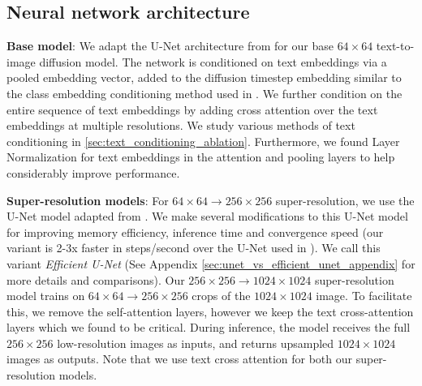 \subsection{Neural network architecture}
\vspace{-0.15cm}
\label{sec:architecture}
\textbf{Base model}: We adapt the U-Net architecture from \cite{nichol2021improved} for our base $64\times64$ text-to-image diffusion model. The network is conditioned on text embeddings via a pooled embedding vector, added to the diffusion timestep embedding similar to the class embedding conditioning method used in \cite{dhariwal2021diffusion, ho2021cascaded}. We further condition on the entire sequence of text embeddings by adding cross attention \cite{rombach-cvpr-2022} over the text embeddings at multiple resolutions. We study various methods of text conditioning in \cref{sec:text_conditioning_ablation}. Furthermore, we found Layer Normalization \cite{ba2016layer} for text embeddings in the attention and pooling layers to help considerably improve performance. 



\textbf{Super-resolution models}: For $64\times64 \rightarrow 256\times256$ super-resolution, we use the U-Net model adapted from \cite{nichol2021improved, sahariac-palette}. We make several modifications to this U-Net model for improving memory efficiency, inference time and convergence speed (our variant is 2-3x faster in steps/second over the U-Net used in \cite{nichol2021improved, sahariac-palette}). We call this variant \textit{Efficient U-Net} (See Appendix \ref{sec:unet_vs_efficient_unet_appendix} for more details and comparisons). Our $256\times256 \rightarrow 1024\times1024$ super-resolution model trains on $64\times64 \rightarrow 256\times 256$ crops of the $1024\times1024$ image. To facilitate this, we remove the self-attention layers, however we keep the text cross-attention layers which we found to be critical. During inference, the model receives the full $256\times256$ low-resolution images as inputs, and returns upsampled $1024\times1024$ images as outputs. Note that we use text cross attention for both our super-resolution models.